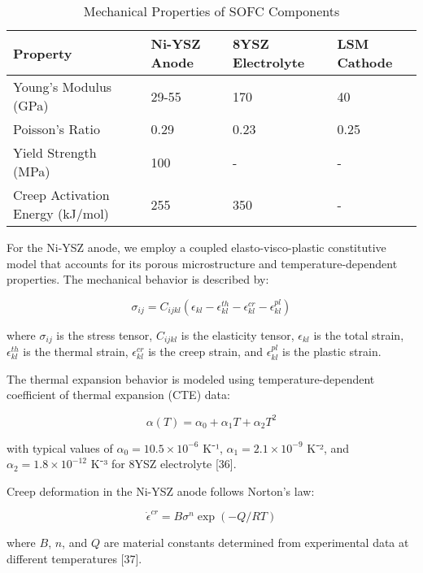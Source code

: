 \documentclass[10pt,conference]{IEEEtran}
\begin{document}
\begin{table}[H]
\centering
\caption{Mechanical Properties of SOFC Components}
\label{tab:mechanical}
\begin{tabular}{@{}llll@{}}
\toprule
Property & Ni-YSZ Anode & 8YSZ Electrolyte & LSM Cathode \\
\midrule
Young's Modulus (GPa) & 29-55 & 170 & 40 \\
Poisson's Ratio & 0.29 & 0.23 & 0.25 \\
Yield Strength (MPa) & 100 & - & - \\
Creep Activation Energy (kJ/mol) & 255 & 350 & - \\
\bottomrule
\end{tabular}
\end{table}

For the Ni-YSZ anode, we employ a coupled elasto-visco-plastic constitutive model that accounts for its porous microstructure and temperature-dependent properties. The mechanical behavior is described by:

\begin{equation}
\sigma_{ij} = C_{ijkl}(\epsilon_{kl} - \epsilon_{kl}^{th} - \epsilon_{kl}^{cr} - \epsilon_{kl}^{pl})
\end{equation}

where $\sigma_{ij}$ is the stress tensor, $C_{ijkl}$ is the elasticity tensor, $\epsilon_{kl}$ is the total strain, $\epsilon_{kl}^{th}$ is the thermal strain, $\epsilon_{kl}^{cr}$ is the creep strain, and $\epsilon_{kl}^{pl}$ is the plastic strain.

The thermal expansion behavior is modeled using temperature-dependent coefficient of thermal expansion (CTE) data:

\begin{equation}
\alpha(T) = \alpha_0 + \alpha_1 T + \alpha_2 T^2
\end{equation}

with typical values of $\alpha_0 = 10.5 \times 10^{-6}$ K⁻¹, $\alpha_1 = 2.1 \times 10^{-9}$ K⁻², and $\alpha_2 = 1.8 \times 10^{-12}$ K⁻³ for 8YSZ electrolyte [36].

Creep deformation in the Ni-YSZ anode follows Norton's law:

\begin{equation}
\dot{\epsilon}^{cr} = B \sigma^n \exp(-Q/RT)
\end{equation}

where $B$, $n$, and $Q$ are material constants determined from experimental data at different temperatures [37].
\end{document}
